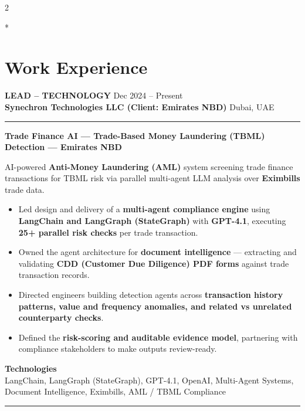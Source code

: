 \documentclass[10pt,a4paper]{article}
\newcommand{\blockdivider}{\vspace{0pt}\color{rulecolor}\rule{\linewidth}{0.5pt}\color{primary}\vspace{4pt}}
\newcommand{\roleheader}[4]{%
  \noindent
  \textbf{\MakeUppercase{#3}}%
  \hfill
  \textcolor{secondary}{#4}\\[0pt]

  \noindent
  \textbf{#1}%
  \hfill
  \textcolor{secondary}{#2}\\[0pt]
}
\newcommand{\roledivider}{%
  \vspace{-1pt}%
  {\color{rulecolor}\rule{\linewidth}{0.5pt}}%
  \vspace{2pt}%
}
\newcommand{\projecttitle}[1]{\textbf{#1}\par\vspace{2pt}}
\begin{document}
\begin{paracol}{2}

\switchcolumn[0]*
\section*{Work Experience}

\roleheader{Synechron Technologies LLC (Client: Emirates NBD)}{Dubai, UAE}{Lead -- Technology}{Dec 2024 -- Present}
\roledivider

\projecttitle{Trade Finance AI — Trade-Based Money Laundering (TBML) Detection — Emirates NBD}

AI-powered \textbf{Anti-Money Laundering (AML)} system screening trade finance transactions for TBML risk via parallel multi-agent LLM analysis over \textbf{Eximbills} trade data.

\begin{itemize}

\item Led design and delivery of a \textbf{multi-agent compliance engine} using \textbf{LangChain and LangGraph (StateGraph)} with \textbf{GPT-4.1}, executing \textbf{25+ parallel risk checks} per trade transaction.

\item Owned the agent architecture for \textbf{document intelligence} — extracting and validating \textbf{CDD (Customer Due Diligence) PDF forms} against trade transaction records.

\item Directed engineers building detection agents across \textbf{transaction history patterns, value and frequency anomalies, and related vs unrelated counterparty checks}.

\item Defined the \textbf{risk-scoring and auditable evidence model}, partnering with compliance stakeholders to make outputs review-ready.

\end{itemize}

\textbf{Technologies}\\
LangChain, LangGraph (StateGraph), GPT-4.1, OpenAI, Multi-Agent Systems, Document Intelligence, Eximbills, AML / TBML Compliance

\blockdivider


\end{paracol}
\end{document}
